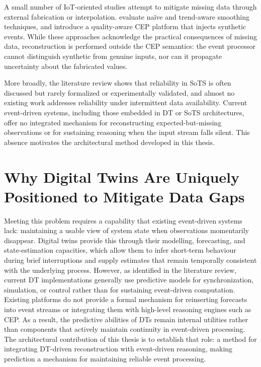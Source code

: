A small number of IoT-oriented studies attempt to mitigate missing data through external fabrication or interpolation. \citet{gkoulis2025assessing} evaluate naïve and trend-aware smoothing techniques, and \citet{gkoulis2024hybrid} introduce a quality-aware CEP platform that injects synthetic events. While these approaches acknowledge the practical consequences of missing data, reconstruction is performed outside the CEP semantics: the event processor cannot distinguish synthetic from genuine inputs, nor can it propagate uncertainty about the fabricated values.

More broadly, the literature review shows that reliability in SoTS is often discussed but rarely formalized or experimentally validated, and almost no existing work addresses reliability under intermittent data availability. Current event-driven systems, including those embedded in DT or SoTS architectures, offer no integrated mechanism for reconstructing expected-but-missing observations or for sustaining reasoning when the input stream falls silent. This absence motivates the architectural method developed in this thesis.

\section{Why Digital Twins Are Uniquely Positioned to Mitigate Data Gaps}

Meeting this problem requires a capability that existing event-driven systems lack: maintaining a usable view of system state when observations momentarily disappear. Digital twins provide this through their modelling, forecasting, and state-estimation capacities, which allow them to infer short-term behaviour during brief interruptions and supply estimates that remain temporally consistent with the underlying process. However, as identified in the literature review, current DT implementations generally use predictive models for synchronization, simulation, or control rather than for sustaining event-driven computation. Existing platforms do not provide a formal mechanism for reinserting forecasts into event streams or integrating them with high-level reasoning engines such as CEP. As a result, the predictive abilities of DTs remain internal utilities rather than components that actively maintain continuity in event-driven processing. The architectural contribution of this thesis is to establish that role: a method for integrating DT-driven reconstruction with event-driven reasoning, making prediction a mechanism for maintaining reliable event processing.

